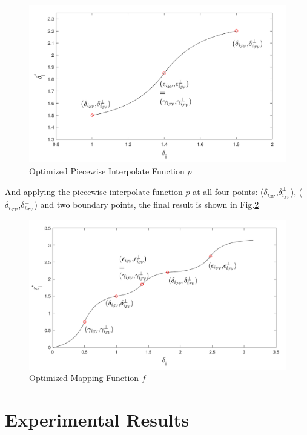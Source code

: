 \begin{figure}[thpb]
\centering
\includegraphics[scale=.7]{Fig/optimized_single_f.pdf}
\caption{Optimized Piecewise Interpolate Function $p$}
\label{fig:optimized_p}
\end{figure}

And applying the piecewise interpolate function $p$ at all four points: ($\delta_{i_{{\mathcal{SV}}}}$,$\delta^{\perp}_{i_{{\mathcal{SV}}}}$), ($\delta_{i_{{\mathcal{FV}}}}$,$\delta^{\perp}_{i_{{\mathcal{FV}}}}$) and two boundary points, the final result is shown in Fig.\ref{fig:optimized_map}

\begin{figure}[thpb]
\centering
\includegraphics[scale=.7]{Fig/optimized_mapping_f.pdf}
\caption{Optimized Mapping Function $f$}
\label{fig:optimized_map}
\end{figure}

\section{Experimental Results}\label{sec:result_spatial}

